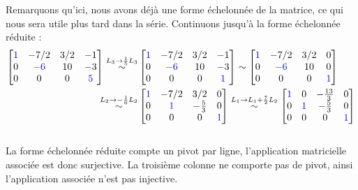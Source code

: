 \documentclass{article}
\begin{document}
Remarquons qu'ici, nous avons déjà une forme échelonnée de la matrice, ce qui nous sera utile plus tard dans la série. Continuons jusqu'à la forme échelonnée réduite :
\begin{align*}
    \begin{bmatrix}
    \color{blue}1 & -7/2 & 3/2 & -1 \\
    0 & \color{blue}-6 & 10 & -3 \\
    0 & 0 & 0 & \color{blue}5
    \end{bmatrix}
    \overset{L_3 \to \frac{1}{5}L_3}{\sim}
    &\begin{bmatrix}
    \color{blue}1 & -7/2 & 3/2 & -1 \\
    0 & \color{blue}-6 & 10 & -3 \\
    0 & 0 & 0 & \color{blue}1
    \end{bmatrix}
    \sim
    \begin{bmatrix}
    \color{blue}1 & -7/2 & 3/2 & 0 \\
    0 & \color{blue}-6 & 10 & 0 \\
    0 & 0 & 0 & \color{blue}1
    \end{bmatrix}\\
    \overset{L_2 \to -\frac{1}{6}L_2}{\sim}
    &\begin{bmatrix}
    \color{blue}1 & -7/2 & 3/2 & 0 \\
    0 & \color{blue}1 & -\frac{5}{3} & 0 \\
    0 & 0 & 0 & \color{blue}1
    \end{bmatrix}
    \overset{L_1 \to L_1 + \frac{7}{2}L_2}{\sim}
    \begin{bmatrix}
    \color{blue}1 & 0 & -\frac{13}{3} & 0 \\
    0 & \color{blue}1 & -\frac{5}{3} & 0 \\
    0 & 0 & 0 & \color{blue}1
    \end{bmatrix}
\end{align*}\\

\noindent La forme échelonnée réduite compte un pivot par ligne, l'application matricielle associée est donc surjective. La troisième colonne ne comporte pas de pivot, ainsi l'application associée n'est pas injective.\\
\end{document}
